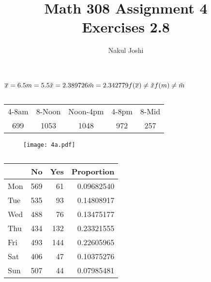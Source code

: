 \documentclass[twocolumn]{article}
\title{Math 308 Assignment 4\\Exercises 2.8}
\author{Nakul Joshi}
\begin{document}
\maketitle

$
\overline{x}=6.5\\
m=5.5\\
\tilde{x}=2.389726\\
\tilde{m}=2.342779\\
f(\overline{x})\neq \tilde{x}\\
f(m)\neq \tilde{m}
$


\subsection{}
\begin{table}[h]
\centering
    \begin{tabular}{ccccc}
    4-8am & 8-Noon & Noon-4pm & 4-8pm & 8-Mid \\
    699   & 1053   & 1048     & 972   & 257   \\
    \end{tabular}
\end{table}
\begin{figure}[h]
\centering
\texttt{[image: 4a.pdf]}
\end{figure}

\newpage

\subsection{}
\vspace{-3em}
\begin{table}[h]
\centering
\begin{tabular}{@{}lrrr@{}}
\toprule
  & No  & Yes & Proportion \\ \midrule
Mon & 569 & 61  & 0.09682540 \\
Tue & 535 & 93  & 0.14808917 \\
Wed & 488 & 76  & 0.13475177 \\
Thu & 434 & 132 & 0.23321555 \\
Fri & 493 & 144 & 0.22605965 \\
Sat & 406 & 47  & 0.10375276 \\
Sun & 507 & 44  & 0.07985481\\
\bottomrule
\end{tabular}
\end{table}
\end{document}
